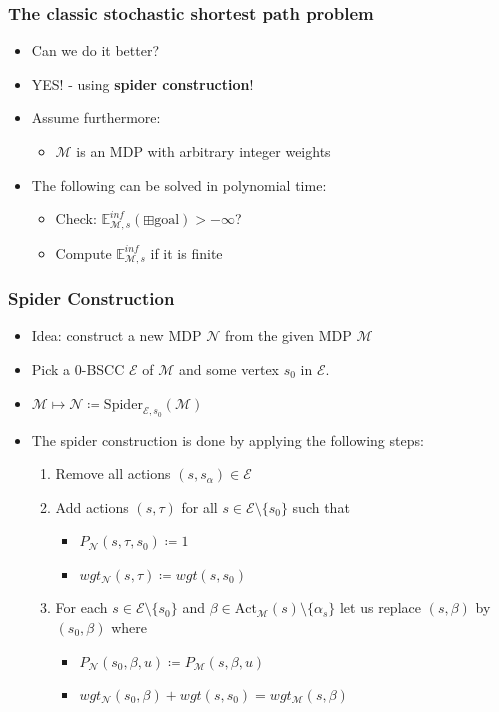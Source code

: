 \documentclass[onlymath]{beamer}
\begin{document}
\begin{frame}
\frametitle{The classic stochastic shortest path problem}
\begin{itemize}
	\item Can we do it better?
	\item YES! - using \textbf{spider construction}!
	\item Assume furthermore:
	\begin{itemize}
		\item $\mathcal{M}$ is an MDP with arbitrary integer weights
	\end{itemize}
	\item The following can be solved in polynomial time:
	\begin{itemize}
		\item Check: $\mathbb{E}_{\mathcal{M},s}^{inf}(\boxplus \mathrm{goal}) > - \infty$?
		\item Compute $\mathbb{E}_{\mathcal{M},s}^{inf}$ if it is finite
	\end{itemize}

\end{itemize}
\end{frame}%

\begin{frame}
	\frametitle{Spider Construction}
	\begin{itemize}
		\item Idea: construct a new MDP $\mathcal{N}$ from the given MDP $\mathcal{M}$
		\item Pick a 0-BSCC $\mathcal{E}$ of $\mathcal{M}$ and some vertex $s_0$ in $\mathcal{E}$.
		\item $\mathcal{M} \mapsto \mathcal{N} \coloneqq \mathrm{Spider}_{\mathcal{E}, s_0}(\mathcal{M})$
		\item The spider construction is done by applying the following steps:
		\begin{enumerate}
			\item Remove all actions $(s, s_\alpha) \in \mathcal{E}$
			\item Add actions $(s, \tau)$ for all $s\in \mathcal{E} \setminus \{s_0\}$ such that
			\begin{itemize}
				\item $P_{\mathcal{N}}(s,\tau,s_0) \coloneqq 1$
				\item $wgt_{\mathcal{N}}(s,\tau) \coloneqq wgt (s, s_0)$
			\end{itemize}
			\item For each $s\in \mathcal{E}\setminus\{s_0\}$ and $\beta \in \mathrm{Act}_{\mathcal{M}}(s)\setminus\{\alpha_s\}$ let us replace $(s,\beta)$ by $(s_0,\beta)$ where
			\begin{itemize}
				\item $P_{\mathcal{N}}(s_0,\beta,u) \coloneqq P_{\mathcal{M}}(s,\beta,u)$
				\item $wgt_{\mathcal{N}}(s_0,\beta) + wgt (s, s_0) = wgt_{\mathcal{M}}(s,\beta)$
			\end{itemize}
		\end{enumerate}
	\end{itemize}

\end{frame}
\end{document}
